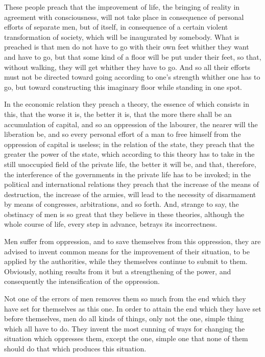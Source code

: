 \documentclass{book}
\begin{document}
These people preach that the improvement of life, the bringing of reality in agreement with consciousness, will not take place in consequence of personal efforts of separate men, but of itself, in consequence of a certain violent transformation of society, which will be inaugurated by somebody. What is preached is that men do not have to go with their own feet whither they want and have to go, but that some kind of a floor will be put under their feet, so that, without walking, they will get whither they have to go. And so all their efforts must not be directed toward going according to one’s strength whither one has to go, but toward constructing this imaginary floor while standing in one spot.

In the economic relation they preach a theory, the essence of which consists in this, that the worse it is, the better it is, that the more there shall be an accumulation of capital, and so an oppression of the labourer, the nearer will the liberation be, and so every personal effort of a man to free himself from the oppression of capital is useless; in the relation of the state, they preach that the greater the power of the state, which according to this theory has to take in the still unoccupied field of the private life, the better it will be, and that, therefore, the interference of the governments in the private life has to be invoked; in the political and international relations they preach that the increase of the means of destruction, the increase of the armies, will lead to the necessity of disarmament by means of congresses, arbitrations, and so forth. And, strange to say, the obstinacy of men is so great that they believe in these theories, although the whole course of life, every step in advance, betrays its incorrectness.

Men suffer from oppression, and to save themselves from this oppression, they are advised to invent common means for the improvement of their situation, to be applied by the authorities, while they themselves continue to submit to them. Obviously, nothing results from it but a strengthening of the power, and consequently the intensification of the oppression.

Not one of the errors of men removes them so much from the end which they have set for themselves as this one. In order to attain the end which they have set before themselves, men do all kinds of things, only not the one, simple thing which all have to do. They invent the most cunning of ways for changing the situation which oppresses them, except the one, simple one that none of them should do that which produces this situation.
\end{document}
